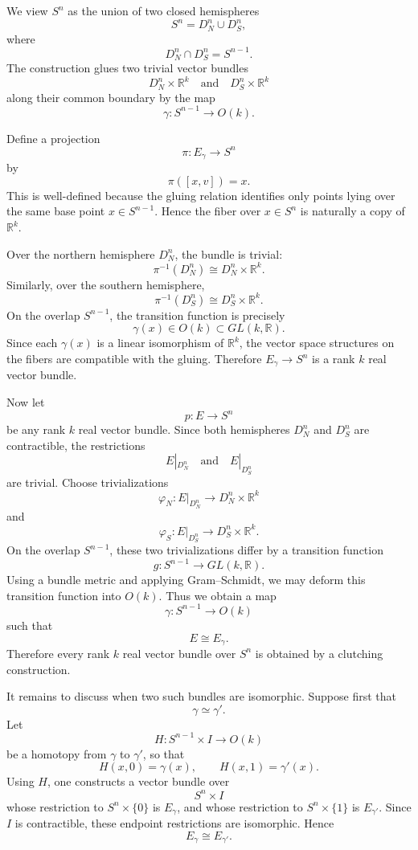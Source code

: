 \begin{solution}
We view \(S^n\) as the union of two closed hemispheres
\[
S^n=D_N^n\cup D_S^n,
\]
where
\[
D_N^n\cap D_S^n=S^{n-1}.
\]
The construction glues two trivial vector bundles
\[
D_N^n\times \mathbb{R}^k
\quad\text{and}\quad
D_S^n\times \mathbb{R}^k
\]
along their common boundary by the map
\[
\gamma:S^{n-1}\to O(k).
\]

Define a projection
\[
\pi:E_{\gamma}\longrightarrow S^n
\]
by
\[
\pi([x,v])=x.
\]
This is well-defined because the gluing relation identifies only points lying over the same base point \(x\in S^{n-1}\). Hence the fiber over \(x\in S^n\) is naturally a copy of \(\mathbb{R}^k\).

Over the northern hemisphere \(D_N^n\), the bundle is trivial:
\[
\pi^{-1}(D_N^n)\cong D_N^n\times \mathbb{R}^k.
\]
Similarly, over the southern hemisphere,
\[
\pi^{-1}(D_S^n)\cong D_S^n\times \mathbb{R}^k.
\]
On the overlap \(S^{n-1}\), the transition function is precisely
\[
\gamma(x)\in O(k)\subset GL(k,\mathbb{R}).
\]
Since each \(\gamma(x)\) is a linear isomorphism of \(\mathbb{R}^k\), the vector space structures on the fibers are compatible with the gluing. Therefore \(E_{\gamma}\to S^n\) is a rank \(k\) real vector bundle.

Now let
\[
p:E\to S^n
\]
be any rank \(k\) real vector bundle. Since both hemispheres \(D_N^n\) and \(D_S^n\) are contractible, the restrictions
\[
E|_{D_N^n}
\quad\text{and}\quad
E|_{D_S^n}
\]
are trivial. Choose trivializations
\[
\varphi_N:E|_{D_N^n}\longrightarrow D_N^n\times \mathbb{R}^k
\]
and
\[
\varphi_S:E|_{D_S^n}\longrightarrow D_S^n\times \mathbb{R}^k.
\]
On the overlap \(S^{n-1}\), these two trivializations differ by a transition function
\[
g:S^{n-1}\longrightarrow GL(k,\mathbb{R}).
\]
Using a bundle metric and applying Gram--Schmidt, we may deform this transition function into \(O(k)\). Thus we obtain a map
\[
\gamma:S^{n-1}\to O(k)
\]
such that
\[
E\cong E_{\gamma}.
\]
Therefore every rank \(k\) real vector bundle over \(S^n\) is obtained by a clutching construction.

It remains to discuss when two such bundles are isomorphic. Suppose first that
\[
\gamma\simeq \gamma'.
\]
Let
\[
H:S^{n-1}\times I\longrightarrow O(k)
\]
be a homotopy from \(\gamma\) to \(\gamma'\), so that
\[
H(x,0)=\gamma(x),
\qquad
H(x,1)=\gamma'(x).
\]
Using \(H\), one constructs a vector bundle over
\[
S^n\times I
\]
whose restriction to \(S^n\times\{0\}\) is \(E_{\gamma}\), and whose restriction to \(S^n\times\{1\}\) is \(E_{\gamma'}\). Since \(I\) is contractible, these endpoint restrictions are isomorphic. Hence
\[
E_{\gamma}\cong E_{\gamma'}.
\]


\end{solution}
